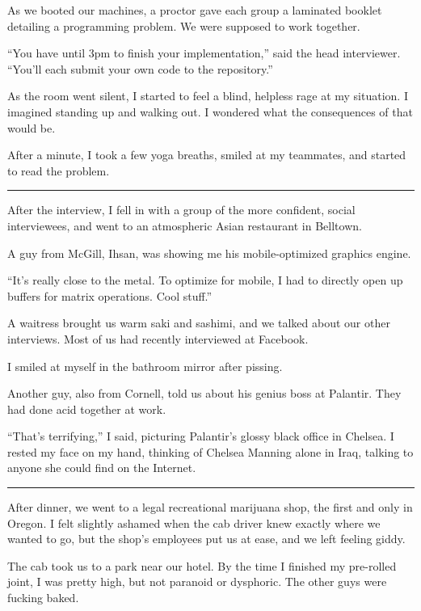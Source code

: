 As we booted our machines, a proctor gave each group a laminated booklet
detailing a programming problem.  We were supposed to work together.

``You have until 3pm to finish your implementation,'' said the head interviewer.
``You'll each submit your own code to the repository.''

As the room went silent, I started to feel a blind, helpless rage at my
situation.  I imagined standing up and walking out.  I wondered what the
consequences of that would be.  

After a minute, I took a few yoga breaths, smiled at my teammates, and started
to read the problem.

\plainfancybreak{12pt}{2}{}


After the interview, I fell in with a group of the more confident, social
interviewees, and went to an atmospheric Asian restaurant in Belltown.

A guy from McGill, Ihsan, was showing me his mobile-optimized graphics engine.

``It's really close to the metal.  To optimize for mobile, I had to directly
open up buffers for matrix operations.  Cool stuff.''

A waitress brought us warm saki and sashimi, and we talked about our other
interviews.  Most of us had recently interviewed at Facebook.

I smiled at myself in the bathroom mirror after pissing.

Another guy, also from Cornell, told us about his genius boss at Palantir.  They
had done acid together at work.

``That's terrifying,'' I said, picturing Palantir's glossy black office in
Chelsea.  I rested my face on my hand, thinking of Chelsea Manning alone in
Iraq, talking to anyone she could find on the Internet.

\plainfancybreak{12pt}{2}{}


After dinner, we went to a legal recreational marijuana shop, the first and only
in Oregon.  I felt slightly ashamed when the cab driver knew exactly where we
wanted to go, but the shop's employees put us at ease, and we left feeling
giddy.  

The cab took us to a park near our hotel.  By the time I finished my pre-rolled
joint, I was pretty high, but not paranoid or dysphoric.   The other guys were
fucking baked.  

